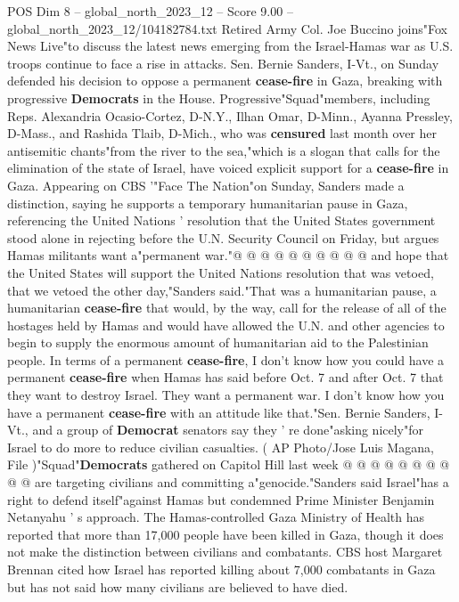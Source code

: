 \begin{textsample}{POS Dim 8 – global\_north\_2023\_12 – Score 9.00 – global\_north\_2023\_12/104182784.txt}  \label{ex:f8_pos_115}
Retired Army Col.
Joe Buccino joins"Fox News Live"to discuss the latest news emerging from the Israel-Hamas war as U.S. troops continue to face a rise in attacks.
Sen.
Bernie Sanders, I-Vt., on Sunday defended his decision to oppose a permanent \textbf{cease-fire} in Gaza, breaking with progressive \textbf{Democrats} in the House.
Progressive"Squad"members, including Reps.
Alexandria Ocasio-Cortez, D-N.Y., Ilhan Omar, D-Minn., Ayanna Pressley, D-Mass., and Rashida Tlaib, D-Mich., who was \textbf{censured} last month over her antisemitic chants"from the river to the sea,"which is a slogan that calls for the elimination of the state of Israel, have voiced explicit support for a \textbf{cease-fire} in Gaza.
Appearing on CBS '"Face The Nation"on Sunday, Sanders made a distinction, saying he supports a temporary humanitarian pause in Gaza, referencing the United Nations ' resolution that the United States government stood alone in rejecting before the U.N.
Security Council on Friday, but argues Hamas militants want a"permanent war."@ @ @ @ @ @ @ @ @ @ and hope that the United States will support the United Nations resolution that was vetoed, that we vetoed the other day,"Sanders said."That was a humanitarian pause, a humanitarian \textbf{cease-fire} that would, by the way, call for the release of all of the hostages held by Hamas and would have allowed the U.N. and other agencies to begin to supply the enormous amount of humanitarian aid to the Palestinian people.
In terms of a permanent \textbf{cease-fire}, I don't know how you could have a permanent \textbf{cease-fire} when Hamas has said before Oct. 7 and after Oct. 7 that they want to destroy Israel.
They want a permanent war.
I don't know how you have a permanent \textbf{cease-fire} with an attitude like that."Sen.
Bernie Sanders, I-Vt., and a group of \textbf{Democrat} senators say they ' re done"asking nicely"for Israel to do more to reduce civilian casualties. ( AP Photo/Jose Luis Magana, File )"Squad"\textbf{Democrats} gathered on Capitol Hill last week @ @ @ @ @ @ @ @ @ @ are targeting civilians and committing a"genocide."Sanders said Israel"has a right to defend itself"against Hamas but condemned Prime Minister Benjamin Netanyahu ' s approach.
The Hamas-controlled Gaza Ministry of Health has reported that more than 17,000 people have been killed in Gaza, though it does not make the distinction between civilians and combatants.
CBS host Margaret Brennan cited how Israel has reported killing about 7,000 combatants in Gaza but has not said how many civilians are believed to have died.

\end{textsample}
